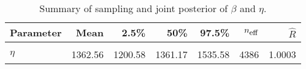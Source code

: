 \begin{table}
\centering
\caption{\label{tab:idler-frame-posterior-summary}Summary of sampling and joint posterior of $\beta$ and $\eta$.}
\centering
\begin{tabular}[t]{lrrrrrr}
\toprule
Parameter & Mean & 2.5\% & 50\% & 97.5\% & $n_{\small{\mbox{eff}}}$ & $\hat{R}$\\
\midrule
\cellcolor{gray!10}{$\beta$} & \cellcolor{gray!10}{1.10} & \cellcolor{gray!10}{1.01} & \cellcolor{gray!10}{1.10} & \cellcolor{gray!10}{1.20} & \cellcolor{gray!10}{5337} & \cellcolor{gray!10}{1.0001}\\
$\eta$ & 1362.56 & 1200.58 & 1361.17 & 1535.58 & 4386 & 1.0003\\
\bottomrule
\end{tabular}
\end{table}
